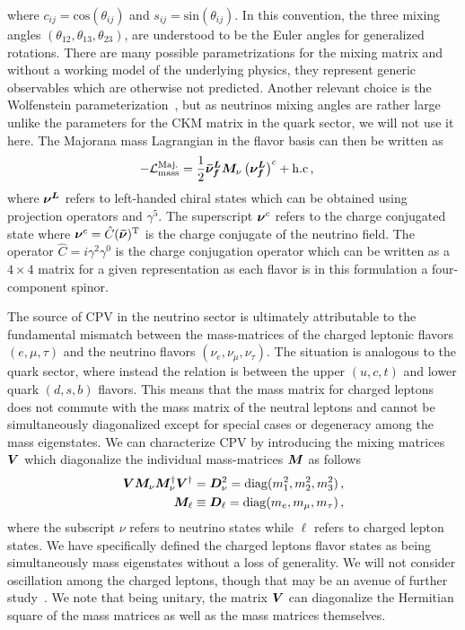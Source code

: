 where $c_{ij} = \mathrm{cos}(\theta_{ij})$ and $s_{ij} = \mathrm{sin}(\theta_{ij})$. In this convention, the three mixing angles $(\theta_{12}, \theta_{13}, \theta_{23})$, are understood to be the Euler angles for generalized rotations. There are many possible parametrizations for the mixing matrix and without a working model of the underlying physics, they represent generic observables which are otherwise not predicted. Another relevant choice is the Wolfenstein parameterization~\citep{wolfenstein1983parametrization}, but as neutrinos mixing angles are rather large unlike the parameters for the CKM matrix in the quark sector, we will not use it here. The Majorana mass Lagrangian in the flavor basis can then be written as
\begin{alignat}{1}
	\label{mass:1} -\mathcal{L}_{\mathrm{mass}}^{\mathrm{Maj.}}&=\frac{1}{2}\boldsymbol{\bar{\nu}_{f}^{L}}\boldsymbol{M}_{\nu}\left(\boldsymbol{\nu_{f}^{L}}\right)^{c}+\mathrm{h.c}\,,
\end{alignat}
where $\boldsymbol{\nu^{L}}$ refers to left-handed chiral states which can be obtained using projection operators and $\gamma^{5}$. The superscript $\boldsymbol{\nu}^{c}$ refers to the charge conjugated state where $\boldsymbol{\nu}^{c} = \hat{C}(\boldsymbol{\bar{\nu}})^{\rm T}$ is the charge conjugate of the neutrino field. The operator $\hat{C} = i\gamma^{2}\gamma^{0}$ is the charge conjugation operator which can be written as a $4\times4$ matrix for a given representation as each flavor is in this formulation a four-component spinor.

The source of CPV in the neutrino sector is ultimately attributable to the fundamental mismatch between the mass-matrices of the charged leptonic flavors $(e,\mu,\tau)$ and the neutrino flavors $(\nu_{e},\nu_{\mu},\nu_{\tau})$. The situation is analogous to the quark sector, where instead the relation is between the upper $(u,c,t)$ and lower quark $(d,s,b)$ flavors. This means that the mass matrix for charged leptons does not commute with the mass matrix of the neutral leptons and cannot be simultaneously diagonalized except for special cases or degeneracy among the mass eigenstates. We can characterize CPV by introducing the mixing matrices $\boldsymbol{V}$ which diagonalize the individual mass-matrices $\boldsymbol{M}$ as follows
\begin{alignat}{1}
	\label{diag:1} \boldsymbol{V}\boldsymbol{M}_{\nu}\boldsymbol{M}_{\nu}^{\dagger}\boldsymbol{V}^{\dagger} = \boldsymbol{D}_{\nu}^{2} = \mathrm{diag}(m_{1}^{2},m_{2}^{2},m_{3}^{2})\,,\\
    \label{diag:2} \boldsymbol{M}_{\ell} \equiv \boldsymbol{D}_{\ell} = \mathrm{diag}(m_{e},m_{\mu},m_{\tau})\,,
\end{alignat}
where the subscript $\nu$ refers to neutrino states while $\ell$ refers to charged lepton states. We have specifically defined the charged leptons flavor states as being simultaneously mass eigenstates without a loss of generality. We will not consider oscillation among the charged leptons, though that may be an avenue of further study~\citep{akhmedov2007charged}. We note that being unitary, the matrix $\boldsymbol{V}$ can diagonalize the Hermitian square of the mass matrices as well as the mass matrices themselves.

